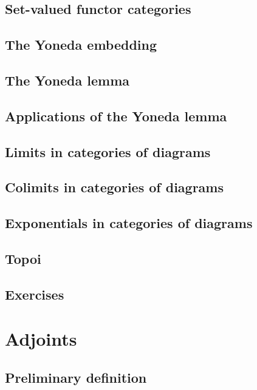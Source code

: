 \documentclass[uplatex, 12pt, dvipdfmx]{jsarticle}
\begin{document}
\subsection{Set-valued functor categories}

\subsection{The Yoneda embedding}

\subsection{The Yoneda lemma}

\subsection{Applications of the Yoneda lemma}

\subsection{Limits in categories of diagrams}

\subsection{Colimits in categories of diagrams}

\subsection{Exponentials in categories of diagrams}

\subsection{Topoi}

\subsection{Exercises}

\section{Adjoints}

\subsection{Preliminary definition}
\end{document}
